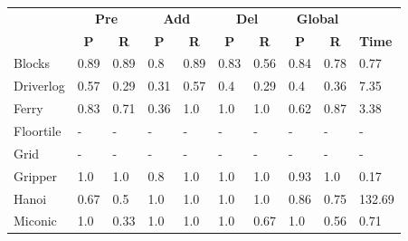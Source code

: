 \begin{table}[hbt!]
	\begin{center}
		\begin{footnotesize}
		\begin{tabular}{l|l|l|l|l|l|l||l|l||l|}
			& \multicolumn{2}{|c|}{\bf Pre} & \multicolumn{2}{|c|}{\bf Add} & \multicolumn{2}{|c||}{\bf Del} & \multicolumn{2}{|c|}{\bf Global} & \\ \cline{2-9}			
			& \multicolumn{1}{|c|}{\bf P} & \multicolumn{1}{|c|}{\bf R} & \multicolumn{1}{|c|}{\bf P} & \multicolumn{1}{|c|}{\bf R} & \multicolumn{1}{|c|}{\bf P} & \multicolumn{1}{|c||}{\bf R} &  \multicolumn{1}{|c|}{\bf P} & \multicolumn{1}{|c|}{\bf R} & {\bf Time} \\
			\hline
			Blocks & 0.89 & 0.89 & 0.8 & 0.89 & 0.83 & 0.56 & 0.84 & 0.78& 0.77 \\ %
			Driverlog & 0.57 & 0.29 & 0.31 & 0.57 & 0.4 & 0.29 & 0.4 & 0.36& 7.35 \\ %
			Ferry & 0.83 & 0.71 & 0.36 & 1.0 & 1.0 & 1.0 & 0.62 & 0.87& 3.38 \\ %
			Floortile & - & - & - & - & - & - & - & - & - \\ %
			Grid & - & - & - & - & - & - & - & - & - \\ %
			Gripper & 1.0 & 1.0 & 0.8 & 1.0 & 1.0 & 1.0 & 0.93 & 1.0& 0.17 \\ %
			Hanoi & 0.67 & 0.5 & 1.0 & 1.0 & 1.0 & 1.0 & 0.86 & 0.75& 132.69 \\ %
			Miconic & 1.0 & 0.33 & 1.0 & 1.0 & 1.0 & 0.67 & 1.0 & 0.56& 0.71 \\ %

\end{tabular}
\end{footnotesize}
\end{center}
\end{table}
